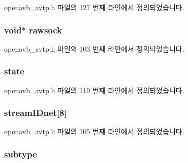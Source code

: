 openavb\+\_\+avtp.\+h 파일의 127 번째 라인에서 정의되었습니다.

\subsubsection[{\texorpdfstring{rawsock}{rawsock}}]{\setlength{\rightskip}{0pt plus 5cm}void$\ast$ rawsock}\hypertarget{structavtp__stream__t_afe47f2588e837096d884e9cbb94a7d20}{}\label{structavtp__stream__t_afe47f2588e837096d884e9cbb94a7d20}


openavb\+\_\+avtp.\+h 파일의 103 번째 라인에서 정의되었습니다.

\subsubsection[{\texorpdfstring{state}{state}}]{ state}\hypertarget{structavtp__stream__t_a8d80202ecf85686d01d46652b7923422}{}\label{structavtp__stream__t_a8d80202ecf85686d01d46652b7923422}


openavb\+\_\+avtp.\+h 파일의 119 번째 라인에서 정의되었습니다.

\subsubsection[{\texorpdfstring{stream\+I\+Dnet}{streamIDnet}}]{ stream\+I\+Dnet\mbox{[}8\mbox{]}}\hypertarget{structavtp__stream__t_a9b673f6e12b6cd5b67db92b5df0eb123}{}\label{structavtp__stream__t_a9b673f6e12b6cd5b67db92b5df0eb123}


openavb\+\_\+avtp.\+h 파일의 105 번째 라인에서 정의되었습니다.

\subsubsection[{\texorpdfstring{subtype}{subtype}}]{ subtype}\hypertarget{structavtp__stream__t_ad61c2796f8f447c2ca8979f4aeccf351}{}\label{structavtp__stream__t_ad61c2796f8f447c2ca8979f4aeccf351}



